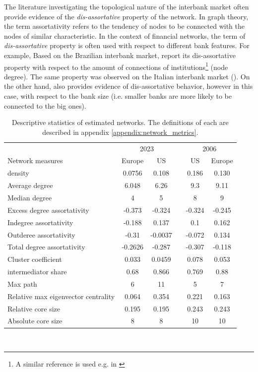 \documentclass[12pt]{article}
\begin{document}
The literature investigating the topological nature of the interbank market often provide evidence of the \textit{dis-assortative} property of the network. In graph theory, the term assortativity refers to the tendency of nodes to be connected with the nodes of similar characteristic. In the context of financial networks, the term of \textit{dis-assortative} property is often used with respect to different bank features. For example, Based on the Brazilian interbank market, \cite{silva16} report its dis-assortative property with respect to the amount of connections of institutions\footnote{A similar reference is used e.g. in \cite{aldasoro17}} (node degree). The same property was observed on the Italian interbank market (\cite{bargigli15}). On the other hand, \cite{craig14} also provides evidence of dis-assortative behavior, however in this case, with respect to the bank size (i.e. smaller banks are more likely to be connected to the big ones).

\begin{table}
	\center
	\begin{tabular}{lcc c cc}
		\hline
		& \multicolumn{2}{c}{2023} & & \multicolumn{2}{c}{2006}\\
		\cline{2-3} \cline{5-6} 
		\multicolumn{1}{l}{Network measures} & \multicolumn{1}{c}{Europe} & \multicolumn{1}{c}{US} && \multicolumn{1}{c}{US} & \multicolumn{1}{c}{Europe}\\
		\hline
		density & 0.0756 & 0.108 && 0.186 & 0.130 \\
		Average degree & 6.048 & 6.26 && 9.3 & 9.11 \\
		Median degree & 4 & 5 && 8 & 9 \\
		Excess degree assortativity & -0.373 & -0.324 && -0.324 & -0.245 \\
		Indegree assortativity & -0.188 & 0.137 && 0.1 & 0.162 \\
		Outderee assortativity & -0.31 & -0.0037 && -0.072 & 0.134 \\    
		Total degree assortativity & -0.2626 & -0.287 && -0.307 & -0.118 \\
		Cluster coefficient & 0.033 & 0.0459 && 0.078 & 0.053 \\
		intermediator share & 0.68 & 0.866 && 0.769 & 0.88 \\   
		Max path & 6 & 11 && 5 & 7 \\
		Relative max eigenvector centrality & 0.064 &  0.354 &&     0.221 & 0.163 \\
		Relative core size & 0.195 & 0.195 && 0.243 & 0.243 \\
		Absolute core size & 8 & 8 && 10 & 10 \\
		\hline
	\end{tabular}\
	\caption{Descriptive statistics of estimated networks. The definitions of each are described in appendix \ref{appendix:network_metrics}.}
	\label{table:network_metrics}
\end{table}
\end{document}
